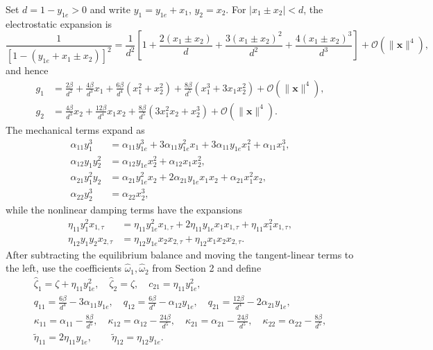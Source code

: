 \documentclass[11pt]{article}
\begin{document}
Set $d=1-y_{1e}>0$ and write $y_1=y_{1e}+x_1$, $y_2=x_2$. For $|x_1\pm x_2|<d$, the electrostatic expansion is
\begin{equation}
\frac{1}{[1-(y_{1e}+x_1\pm x_2)]^2}
=\frac{1}{d^2}\left[1+\frac{2(x_1\pm x_2)}{d}+\frac{3(x_1\pm x_2)^2}{d^2}+\frac{4(x_1\pm x_2)^3}{d^3}\right]+\mathcal{O}(\|\mathbf{x}\|^4),
\end{equation}
and hence
\begin{align*}
g_1&=\frac{2\beta}{d^2}+\frac{4\beta}{d^3}x_1+\frac{6\beta}{d^4}(x_1^2+x_2^2)+\frac{8\beta}{d^5}(x_1^3+3x_1x_2^2)+\mathcal{O}(\|\mathbf{x}\|^4),\\
g_2&=\frac{4\beta}{d^3}x_2+\frac{12\beta}{d^4}x_1x_2+\frac{8\beta}{d^5}(3x_1^2x_2+x_2^3)+\mathcal{O}(\|\mathbf{x}\|^4).
\end{align*}
The mechanical terms expand as
\begin{align*}
\alpha_{11}y_1^3&=\alpha_{11}y_{1e}^3+3\alpha_{11}y_{1e}^2x_1+3\alpha_{11}y_{1e}x_1^2+\alpha_{11}x_1^3,\\
\alpha_{12}y_1y_2^2&=\alpha_{12}y_{1e}x_2^2+\alpha_{12}x_1x_2^2,\\
\alpha_{21}y_1^2y_2&=\alpha_{21}y_{1e}^2x_2+2\alpha_{21}y_{1e}x_1x_2+\alpha_{21}x_1^2x_2,\\
\alpha_{22}y_2^3&=\alpha_{22}x_2^3,
\end{align*}
while the nonlinear damping terms have the expansions
\begin{align*}
\eta_{11}y_1^2x_{1,\tau}&=\eta_{11}y_{1e}^2x_{1,\tau}+2\eta_{11}y_{1e}x_1x_{1,\tau}+\eta_{11}x_1^2x_{1,\tau},\\
\eta_{12}y_1y_2x_{2,\tau}&=\eta_{12}y_{1e}x_2x_{2,\tau}+\eta_{12}x_1x_2x_{2,\tau}.
\end{align*}
After subtracting the equilibrium balance and moving the tangent-linear terms to the left, use the coefficients $\hat{\omega}_1,\hat{\omega}_2$ from Section 2 and define
\begin{gather*}
\hat{\zeta}_1=\zeta+\eta_{11}y_{1e}^2,\quad \hat{\zeta}_2=\zeta,\quad c_{21}=\eta_{11}y_{1e}^2,\\
q_{11}=\frac{6\beta}{d^4}-3\alpha_{11}y_{1e},\quad q_{12}=\frac{6\beta}{d^4}-\alpha_{12}y_{1e},\quad q_{21}=\frac{12\beta}{d^4}-2\alpha_{21}y_{1e},\\
\kappa_{11}=\alpha_{11}-\frac{8\beta}{d^5},\quad \kappa_{12}=\alpha_{12}-\frac{24\beta}{d^5},\quad
\kappa_{21}=\alpha_{21}-\frac{24\beta}{d^5},\quad \kappa_{22}=\alpha_{22}-\frac{8\beta}{d^5},\\
\tilde{\eta}_{11}=2\eta_{11}y_{1e},\qquad \tilde{\eta}_{12}=\eta_{12}y_{1e}.
\end{gather*}
\end{document}
